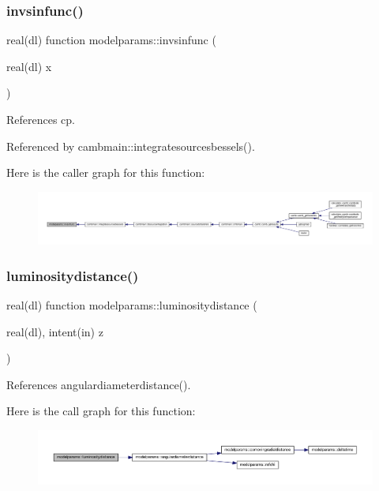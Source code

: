 \subsubsection{\texorpdfstring{invsinfunc()}{invsinfunc()}}
{\footnotesize\ttfamily real(dl) function modelparams\+::invsinfunc (\begin{DoxyParamCaption}\item[{real(dl)}]{x }\end{DoxyParamCaption})}



References cp.



Referenced by cambmain\+::integratesourcesbessels().

Here is the caller graph for this function\+:
\nopagebreak
\begin{figure}[H]
\begin{center}
\leavevmode
\includegraphics[width=350pt]{namespacemodelparams_a463f6e148b9f2c45ec30cb28c29bb4e3_icgraph}
\end{center}
\end{figure}
\mbox{\label{namespacemodelparams_a40c5d69daf3f5689ecf0c29c19257028}} 
\subsubsection{\texorpdfstring{luminositydistance()}{luminositydistance()}}
{\footnotesize\ttfamily real(dl) function modelparams\+::luminositydistance (\begin{DoxyParamCaption}\item[{real(dl), intent(in)}]{z }\end{DoxyParamCaption})}



References angulardiameterdistance().

Here is the call graph for this function\+:
\nopagebreak
\begin{figure}[H]
\begin{center}
\leavevmode
\includegraphics[width=350pt]{namespacemodelparams_a40c5d69daf3f5689ecf0c29c19257028_cgraph}
\end{center}
\end{figure}
\mbox{\label{namespacemodelparams_af7cba6b22f91f9428ebecb63823d451a}} 
